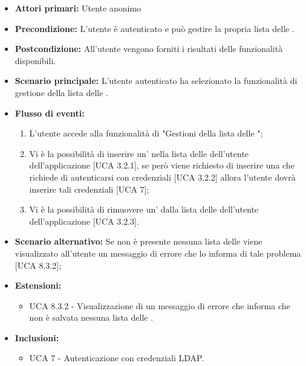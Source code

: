 \begin{itemize}
	\item \textbf{Attori primari:} Utente anonimo
	\item \textbf{Precondizione:} L'utente è autenticato e può gestire la propria lista delle .
	\item \textbf{Postcondizione:} All'utente vengono forniti i risultati delle funzionalità disponibili.
	\item \textbf{Scenario principale:} L'utente autenticato ha selezionato la funzionalità di gestione della lista delle .
	\item \textbf{Flusso di eventi:}
			\begin{enumerate}
			\item L'utente accede alla funzionalità di "Gestioni della lista delle ";
			\item Vi è la possibilità di inserire un' nella lista delle  dell'utente dell'applicazione [UCA 3.2.1], se però viene richiesto di inserire una  che richiede di autenticarsi con credenziali  [UCA 3.2.2] allora l'utente dovrà inserire tali credenziali [UCA 7];
			\item Vi è la possibilità di rimuovere un' dalla lista delle  dell'utente dell'applicazione [UCA 3.2.3].
			\end{enumerate}
	\item \textbf{Scenario alternativo:} Se non è presente nessuna lista delle  viene visualizzato all'utente un messaggio di errore che lo informa di tale problema [UCA 8.3.2];
	\item \textbf{Estensioni:}
	\begin{itemize}
		\item UCA 8.3.2 - Visualizzazione di un messaggio di errore che informa che non è salvata nessuna lista delle .
	\end{itemize}
	\item \textbf{Inclusioni:}
	\begin{itemize}
			\item UCA 7 - Autenticazione con credenziali LDAP.
	\end{itemize}
\end{itemize}

